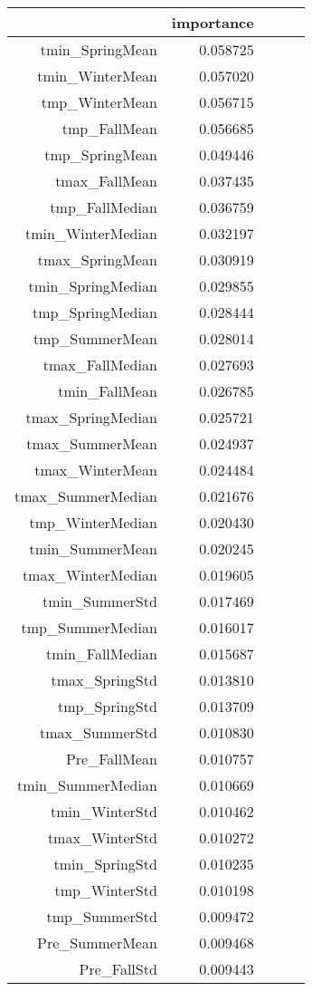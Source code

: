 \begin{tabular}{rrrrr}
\toprule
 & importance \\
\midrule
tmin_SpringMean & 0.058725 \\
tmin_WinterMean & 0.057020 \\
tmp_WinterMean & 0.056715 \\
tmp_FallMean & 0.056685 \\
tmp_SpringMean & 0.049446 \\
tmax_FallMean & 0.037435 \\
tmp_FallMedian & 0.036759 \\
tmin_WinterMedian & 0.032197 \\
tmax_SpringMean & 0.030919 \\
tmin_SpringMedian & 0.029855 \\
tmp_SpringMedian & 0.028444 \\
tmp_SummerMean & 0.028014 \\
tmax_FallMedian & 0.027693 \\
tmin_FallMean & 0.026785 \\
tmax_SpringMedian & 0.025721 \\
tmax_SummerMean & 0.024937 \\
tmax_WinterMean & 0.024484 \\
tmax_SummerMedian & 0.021676 \\
tmp_WinterMedian & 0.020430 \\
tmin_SummerMean & 0.020245 \\
tmax_WinterMedian & 0.019605 \\
tmin_SummerStd & 0.017469 \\
tmp_SummerMedian & 0.016017 \\
tmin_FallMedian & 0.015687 \\
tmax_SpringStd & 0.013810 \\
tmp_SpringStd & 0.013709 \\
tmax_SummerStd & 0.010830 \\
Pre_FallMean & 0.010757 \\
tmin_SummerMedian & 0.010669 \\
tmin_WinterStd & 0.010462 \\
tmax_WinterStd & 0.010272 \\
tmin_SpringStd & 0.010235 \\
tmp_WinterStd & 0.010198 \\
tmp_SummerStd & 0.009472 \\
Pre_SummerMean & 0.009468 \\
Pre_FallStd & 0.009443 \\

\end{tabular}
